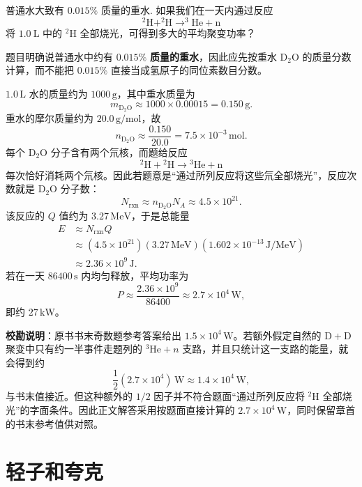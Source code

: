 \begin{exercise}\label{ex:29.37}
普通水大致有 $0.015\%$ 质量的重水. 如果我们在一天内通过反应
$$ ^2\mathrm{H} + ^2\mathrm{H} \rightarrow ^3\mathrm{He} + \mathrm{n} $$
将 $1.0 \ \mathrm{L}$ 中的 $^2\mathrm{H}$ 全部烧光，可得到多大的平均聚变功率？
\end{exercise}
\begin{solution}
题目明确说普通水中约有 $0.015\%$ \textbf{质量的重水}，因此应先按重水 $\mathrm{D_2O}$ 的质量分数计算，而不能把 $0.015\%$ 直接当成氢原子的同位素数目分数。

$1.0\,\mathrm{L}$ 水的质量约为 $1000\,\mathrm{g}$，其中重水质量为
$$ m_{\mathrm{D_2O}}\approx1000\times0.00015=0.150\,\mathrm{g}. $$
重水的摩尔质量约为 $20.0\,\mathrm{g/mol}$，故
$$ n_{\mathrm{D_2O}}\approx\frac{0.150}{20.0}=7.5\times10^{-3}\,\mathrm{mol}. $$
每个 $\mathrm{D_2O}$ 分子含有两个氘核，而题给反应
$$ {}^2\mathrm H+{}^2\mathrm H\rightarrow{}^3\mathrm{He}+\mathrm n $$
每次恰好消耗两个氘核。因此若题意是“通过所列反应将这些氘全部烧光”，反应次数就是 $\mathrm{D_2O}$ 分子数：
$$ N_{\mathrm{rxn}}\approx n_{\mathrm{D_2O}}N_A\approx4.5\times10^{21}. $$
该反应的 $Q$ 值约为 $3.27\,\mathrm{MeV}$，于是总能量
\begin{align*}
E&\approx N_{\mathrm{rxn}}Q\\
 &\approx(4.5\times10^{21})(3.27\,\mathrm{MeV})(1.602\times10^{-13}\,\mathrm{J/MeV})\\
 &\approx2.36\times10^9\,\mathrm J.
\end{align*}
若在一天 $86400\,\mathrm s$ 内均匀释放，平均功率为
$$ P\approx\frac{2.36\times10^9}{86400}\approx2.7\times10^4\,\mathrm W, $$
即约 $27\,\mathrm{kW}$。

\textbf{校勘说明}：原书书末奇数题参考答案给出 $1.5\times10^4\,\mathrm W$。若额外假定自然的 $\mathrm{D+D}$ 聚变中只有约一半事件走题列的 $^3\mathrm{He}+n$ 支路，并且只统计这一支路的能量，就会得到约
$$ \frac12(2.7\times10^4)\,\mathrm W\approx1.4\times10^4\,\mathrm W, $$
与书末值接近。但这种额外的 $1/2$ 因子并不符合题面“通过所列反应将 $^2\mathrm H$ 全部烧光”的字面条件。因此正文解答采用按题面直接计算的 $2.7\times10^4\,\mathrm W$，同时保留章首的书末参考值供对照。
\end{solution}



\chapter{轻子和夸克}

